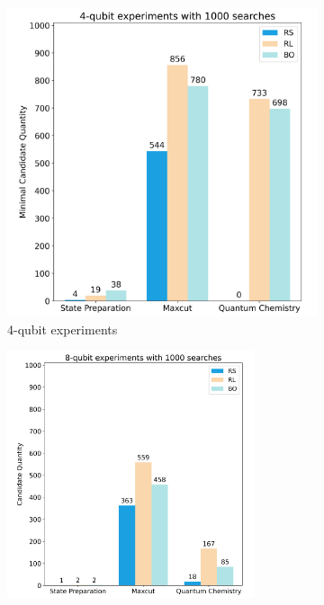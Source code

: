 \documentclass{article} %
\begin{document}
\begin{figure}[htbp]
\begin{subfigure}[b]{0.48\textwidth}
\begin{minipage}[b]{0.28\textwidth}
            \includegraphics[width=\textwidth]{images/4-qubits_experiments_candidates_min.png}  %
        \end{minipage}
    \caption{4-qubit experiments}
    \label{4-qubits_candidates}
    \end{subfigure}
    \hspace{-1.5em}
    \begin{subfigure}[b]{0.48\textwidth}
        \centering
        \begin{minipage}[b]{0.7\textwidth}
            \centering
            \includegraphics[width=0.8\textwidth]{images/8-qubits_experiments_candidates.png}

\end{minipage}
\end{subfigure}
\end{figure}
\end{document}
